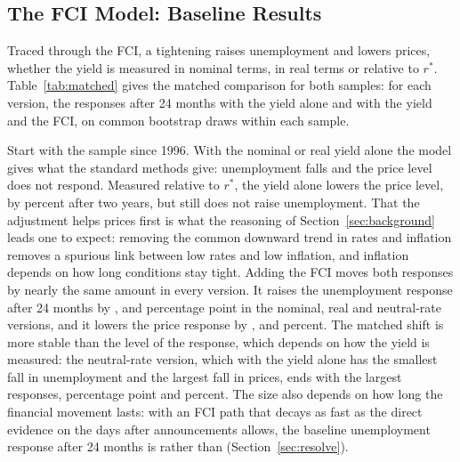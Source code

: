\documentclass[11pt]{article}
\newcommand{\rs}{r^{*}}
\begin{document}
\subsection{The FCI Model: Baseline Results}\label{sec:baseline}
Traced through the FCI, a tightening raises unemployment and lowers prices, whether the yield is measured in nominal terms, in real terms or relative to $\rs$. Table~\ref{tab:matched} gives the matched comparison for both samples: for each version, the responses after 24 months with the yield alone and with the yield and the FCI, on common bootstrap draws within each sample.



Start with the sample since 1996. With the nominal or real yield alone the model gives what the standard methods give: unemployment falls and the price level does not respond. Measured relative to $\rs$, the yield alone lowers the price level, by  percent after two years, but still does not raise unemployment. That the adjustment helps prices first is what the reasoning of Section~\ref{sec:background} leads one to expect: removing the common downward trend in rates and inflation removes a spurious link between low rates and low inflation, and inflation depends on how long conditions stay tight. Adding the FCI moves both responses by nearly the same amount in every version. It raises the unemployment response after 24 months by ,  and  percentage point in the nominal, real and neutral-rate versions, and it lowers the price response by ,  and  percent. The matched shift is more stable than the level of the response, which depends on how the yield is measured: the neutral-rate version, which with the yield alone has the smallest fall in unemployment and the largest fall in prices, ends with the largest responses,  percentage point and  percent. The size also depends on how long the financial movement lasts: with an FCI path that decays as fast as the direct evidence on the days after announcements allows, the baseline unemployment response after 24 months is  rather than  (Section~\ref{sec:resolve}).
\end{document}
